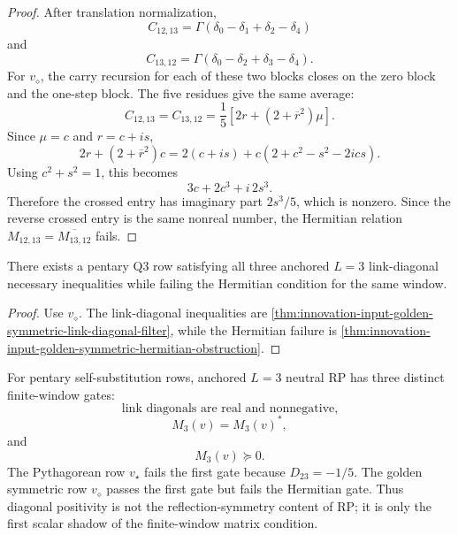 \begin{proof}
After translation normalization,
$$
C_{12,13}
=
\Gamma(\delta_0-\delta_1+\delta_2-\delta_4)
$$
and
$$
C_{13,12}
=
\Gamma(\delta_0-\delta_2+\delta_3-\delta_4).
$$
For $v_\diamond$, the carry recursion for each of these two blocks closes
on the zero block and the one-step block. The five residues give the same
average:
$$
C_{12,13}
=
C_{13,12}
=
\frac15
\left[
2r+(2+\overline r^2)\mu
\right].
$$
Since $\mu=c$ and $r=c+is$,
$$
2r+(2+\overline r^2)c
=
2(c+is)
+c\left(2+c^2-s^2-2ics\right).
$$
Using $c^2+s^2=1$, this becomes
$$
3c+2c^3+i\,2s^3.
$$
Therefore the crossed entry has imaginary part $2s^3/5$, which is
nonzero. Since the reverse crossed entry is the same nonreal number, the
Hermitian relation $M_{12,13}=\overline{M_{13,12}}$ fails.
\end{proof}

\begin{corollary}
\label{cor:innovation-input-diagonal-passage-not-hermitian-passage}
There exists a pentary Q3 row satisfying all three anchored $L=3$
link-diagonal necessary inequalities while failing the Hermitian condition
for the same window.
\end{corollary}

\begin{proof}
Use $v_\diamond$. The link-diagonal inequalities are
\autoref{thm:innovation-input-golden-symmetric-link-diagonal-filter},
while the Hermitian failure is
\autoref{thm:innovation-input-golden-symmetric-hermitian-obstruction}.
\end{proof}

\begin{principle}[Pentary $L=3$ RP gates]
\label{prin:innovation-input-pentary-lthree-rp-gates}
For pentary self-substitution rows, anchored $L=3$ neutral RP has three
distinct finite-window gates:
$$
\text{link diagonals are real and nonnegative,}
$$
$$
M_3(v)=M_3(v)^*,
$$
and
$$
M_3(v)\succeq0.
$$
The Pythagorean row $v_\star$ fails the first gate because
$D_{23}=-1/5$. The golden symmetric row $v_\diamond$ passes the first
gate but fails the Hermitian gate. Thus diagonal positivity is not the
reflection-symmetry content of RP; it is only the first scalar shadow of
the finite-window matrix condition.
\end{principle}

